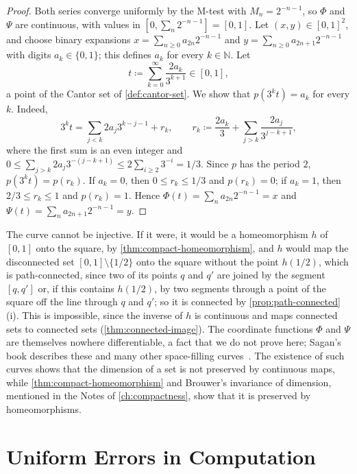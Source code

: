 \begin{proof}
Both series converge uniformly by the M-test with $M_n=2^{-n-1}$, so $\Phi$ and $\Psi$ are continuous, with values in $[0,\sum_n2^{-n-1}]=[0,1]$. Let $(x,y)\in[0,1]^2$, and choose binary expansions $x=\sum_{n\ge0}a_{2n}2^{-n-1}$ and $y=\sum_{n\ge0}a_{2n+1}2^{-n-1}$ with digits $a_k\in\{0,1\}$; this defines $a_k$ for every $k\in\mathbb N$. Let
\[
t\coloneqq\sum_{k=0}^\infty\frac{2a_k}{3^{k+1}}\in[0,1] ,
\]
a point of the Cantor set of \cref{def:cantor-set}. We show that $p(3^kt)=a_k$ for every $k$. Indeed,
\[
3^kt=\sum_{j<k}2a_j3^{k-j-1}+r_k,\qquad r_k\coloneqq\frac{2a_k}3+\sum_{j>k}\frac{2a_j}{3^{j-k+1}} ,
\]
where the first sum is an even integer and $0\le\sum_{j>k}2a_j3^{-(j-k+1)}\le2\sum_{i\ge2}3^{-i}=1/3$. Since $p$ has the period $2$, $p(3^kt)=p(r_k)$. If $a_k=0$, then $0\le r_k\le1/3$ and $p(r_k)=0$; if $a_k=1$, then $2/3\le r_k\le1$ and $p(r_k)=1$. Hence $\Phi(t)=\sum_na_{2n}2^{-n-1}=x$ and $\Psi(t)=\sum_na_{2n+1}2^{-n-1}=y$.
\end{proof}

The curve cannot be injective. If it were, it would be a homeomorphism $h$ of $[0,1]$ onto the square, by \cref{thm:compact-homeomorphism}, and $h$ would map the disconnected set $[0,1]\setminus\{1/2\}$ onto the square without the point $h(1/2)$, which is path-connected, since two of its points $q$ and $q'$ are joined by the segment $[q,q']$ or, if this contains $h(1/2)$, by two segments through a point of the square off the line through $q$ and $q'$; so it is connected by \cref{prop:path-connected}\,(i). This is impossible, since the inverse of $h$ is continuous and maps connected sets to connected sets (\cref{thm:connected-image}). The coordinate functions $\Phi$ and $\Psi$ are themselves nowhere differentiable, a fact that we do not prove here; Sagan's book describes these and many other space-filling curves~\cite{sagan1994}. The existence of such curves shows that the dimension of a set is not preserved by continuous maps, while \cref{thm:compact-homeomorphism} and Brouwer's invariance of dimension, mentioned in the Notes of \cref{ch:compactness}, show that it is preserved by homeomorphisms.

\section{Uniform Errors in Computation}
\label{sec:uniform-computation}

